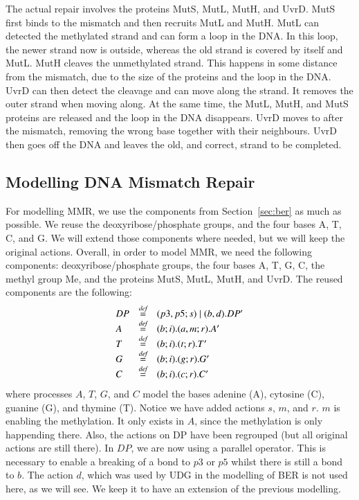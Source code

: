The actual repair involves the proteins MutS, MutL, MutH, and UvrD. MutS first binds to the mismatch and then recruits MutL and MutH. MutL can detected the methylated strand and can form a loop in the DNA. In this loop, the newer strand now is outside, whereas the old strand is covered by itself and MutL. MutH cleaves the unmethylated strand. This happens in some distance from the mismatch, due to the size of the proteins and the loop in the DNA. UvrD can then detect the cleavage and can move along the strand. It removes the outer strand when moving along. At the same time, the MutL, MutH, and MutS proteins are released and the loop in the DNA disappears. UvrD moves to after the mismatch, removing the wrong base together with their neighbours. UvrD then goes off the DNA and leaves the old, and correct, strand to be completed. 

\subsection{Modelling DNA Mismatch Repair}

For modelling MMR, we use the components from Section~\ref{sec:ber} as much as possible. We reuse the deoxyribose/phosphate groups, and the four bases A, T, C, and G. We will extend those components where needed, but we will keep the original actions. Overall, in order to model MMR, we need the following components: deoxyribose/phosphate groups, the four bases A, T, G, C, the methyl group Me, and the proteins MutS, MutL, MutH, and UvrD. The reused components are the following:
%
$$\begin{array}{lll}
DP & \stackrel{\emph{def}}{=} & (p3,p5;s) \; \vert \; (b,d).DP'\\
A & \stackrel{\emph{def}}{=} & (b;i).(a,m;r).A'\\
T & \stackrel{\emph{def}}{=} & (b;i).(t;r).T'\\
G & \stackrel{\emph{def}}{=} & (b;i).(g;r).G'\\
C & \stackrel{\emph{def}}{=} & (b;i).(c;r).C'\\
\end{array}$$
%
where processes $A$, $T$, $G$, and $C$ model the bases adenine (A), cytosine (C), guanine (G), and thymine (T). Notice we have added actions $s$, $m$, and $r$. $m$ is enabling the methylation. It only exists in $A$, since the methylation is only happending there. Also, the actions on DP have been regrouped (but all original actions are still there). In $DP$, we are now using a parallel operator. This is necessary to enable a breaking of a bond to $p3$ or $p5$ whilst there is still a bond to $b$. The action $d$, which was used by UDG in the modelling of BER is not used here, as we will see. We keep it to have an extension of the previous modelling.

